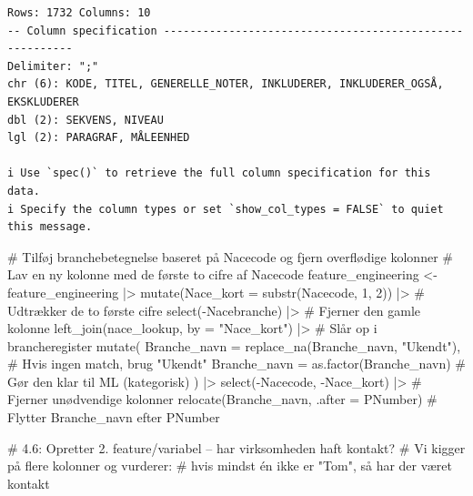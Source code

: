 \documentclass[
  11pt,
  letterpaper,
  DIV=11,
  numbers=noendperiod]{scrartcl}
\newenvironment{Shaded}{\begin{snugshade}}{\end{snugshade}}
\newcommand{\AttributeTok}[1]{\textcolor[rgb]{0.40,0.45,0.13}{#1}}
\newcommand{\CommentTok}[1]{\textcolor[rgb]{0.37,0.37,0.37}{#1}}
\newcommand{\DecValTok}[1]{\textcolor[rgb]{0.68,0.00,0.00}{#1}}
\newcommand{\FunctionTok}[1]{\textcolor[rgb]{0.28,0.35,0.67}{#1}}
\newcommand{\NormalTok}[1]{\textcolor[rgb]{0.00,0.23,0.31}{#1}}
\newcommand{\OtherTok}[1]{\textcolor[rgb]{0.00,0.23,0.31}{#1}}
\newcommand{\SpecialCharTok}[1]{\textcolor[rgb]{0.37,0.37,0.37}{#1}}
\newcommand{\StringTok}[1]{\textcolor[rgb]{0.13,0.47,0.30}{#1}}
\begin{document}
\begin{verbatim}
Rows: 1732 Columns: 10
-- Column specification --------------------------------------------------------
Delimiter: ";"
chr (6): KODE, TITEL, GENERELLE_NOTER, INKLUDERER, INKLUDERER_OGSÅ, EKSKLUDERER
dbl (2): SEKVENS, NIVEAU
lgl (2): PARAGRAF, MÅLEENHED

i Use `spec()` to retrieve the full column specification for this data.
i Specify the column types or set `show_col_types = FALSE` to quiet this message.
\end{verbatim}

\begin{Shaded}
\begin{Highlighting}[]
\CommentTok{\# Tilføj branchebetegnelse baseret på Nacecode og fjern overflødige kolonner}
\CommentTok{\# Lav en ny kolonne med de første to cifre af Nacecode}
\NormalTok{feature\_engineering }\OtherTok{\textless{}{-}}\NormalTok{ feature\_engineering }\SpecialCharTok{|\textgreater{}} 
  \FunctionTok{mutate}\NormalTok{(}\AttributeTok{Nace\_kort =} \FunctionTok{substr}\NormalTok{(Nacecode, }\DecValTok{1}\NormalTok{, }\DecValTok{2}\NormalTok{)) }\SpecialCharTok{|\textgreater{}} \CommentTok{\# Udtrækker de to første cifre}
  \FunctionTok{select}\NormalTok{(}\SpecialCharTok{{-}}\NormalTok{Nacebranche) }\SpecialCharTok{|\textgreater{}}                       \CommentTok{\# Fjerner den gamle kolonne}
  \FunctionTok{left\_join}\NormalTok{(nace\_lookup, }\AttributeTok{by =} \StringTok{"Nace\_kort"}\NormalTok{) }\SpecialCharTok{|\textgreater{}}   \CommentTok{\# Slår op i brancheregister}
  \FunctionTok{mutate}\NormalTok{(}
    \AttributeTok{Branche\_navn =} \FunctionTok{replace\_na}\NormalTok{(Branche\_navn, }\StringTok{"Ukendt"}\NormalTok{), }
    \CommentTok{\# Hvis ingen match, brug "Ukendt"}
    \AttributeTok{Branche\_navn =} \FunctionTok{as.factor}\NormalTok{(Branche\_navn) }
    \CommentTok{\# Gør den klar til ML (kategorisk)}
\NormalTok{  ) }\SpecialCharTok{|\textgreater{}} 
  \FunctionTok{select}\NormalTok{(}\SpecialCharTok{{-}}\NormalTok{Nacecode, }\SpecialCharTok{{-}}\NormalTok{Nace\_kort) }\SpecialCharTok{|\textgreater{}}         \CommentTok{\# Fjerner unødvendige kolonner}
  \FunctionTok{relocate}\NormalTok{(Branche\_navn, }\AttributeTok{.after =}\NormalTok{ PNumber) }\CommentTok{\# Flytter Branche\_navn efter PNumber}



\CommentTok{\# 4.6: Opretter 2. feature/variabel – har virksomheden haft kontakt?}
\CommentTok{\# Vi kigger på flere kolonner og vurderer: }
\CommentTok{\# hvis mindst én ikke er "Tom", så har der været kontakt}


\end{Highlighting}
\end{Shaded}
\end{document}
